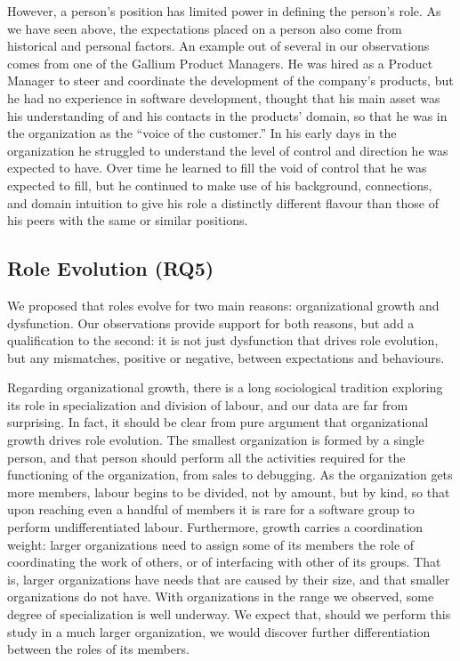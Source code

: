 \documentclass[10pt, conference, compsocconf]{IEEEtran}
\begin{document}
However, a person's position has limited power in defining the person's role. As we have seen above, the expectations placed on a person also come from historical and personal factors. An example out of several in our observations comes from one of the Gallium Product Managers. He was hired as a Product Manager to steer and coordinate the development of the company's products, but he had no experience in software development, thought that his main asset was his understanding of and his contacts in the products' domain, so that he was in the organization as the ``voice of the customer.'' In his early days in the organization he struggled to understand the level of control and direction he was expected to have. Over time he learned to fill the void of control that he was expected to fill, but he continued to make use of his background, connections, and domain intuition to give his role a distinctly different flavour than those of his peers with the same or similar positions.


\subsection{Role Evolution (RQ5)}

We proposed that roles evolve for two main reasons: organizational growth and dysfunction. Our observations provide support for both reasons, but add a qualification to the second: it is not just dysfunction that drives role evolution, but any mismatches, positive or negative, between expectations and behaviours.

Regarding organizational growth, there is a long sociological tradition exploring its role in specialization and division of labour, and our data are far from surprising. In fact, it should be clear from pure argument that organizational growth drives role evolution. The smallest organization is formed by a single person, and that person should perform all the activities required for the functioning of the organization, from sales to debugging. As the organization gets more members, labour begins to be divided, not by amount, but by kind, so that upon reaching even a handful of members it is rare for a software group to perform undifferentiated labour. Furthermore, growth carries a coordination weight: larger organizations need to assign some of its members the role of coordinating the work of others, or of interfacing with other of its groups. That is, larger organizations have needs that are caused by their size, and that smaller organizations do not have. With organizations in the range we observed, some degree of specialization is well underway. We expect that, should we perform this study in a much larger organization, we would discover further differentiation between the roles of its members.
\end{document}
